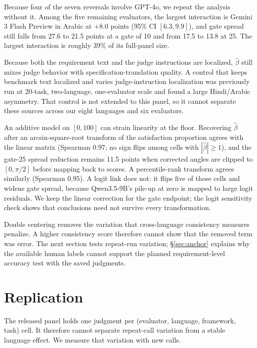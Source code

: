 \documentclass[sigconf,anonymous]{aamas}
\begin{document}
Because four of the seven reversals involve GPT-4o, we repeat the analysis
without it. Among the five remaining evaluators, the largest interaction is
Gemini 3 Flash Preview in Arabic at $+8.0$ points (95\% CI $[6.3, 9.9]$), and gate spread still
falls from 27.6 to 21.5 points at a gate of 10 and from 17.5 to 13.8 at 25. The
largest interaction is roughly 39\% of its full-panel size.

Because both the requirement text and the judge instructions are localized,
$\hat\beta$ still mixes judge behavior with specification-translation quality.
A control that keeps benchmark text localized and varies judge-instruction
localization was previously run at 20-task, two-language, one-evaluator scale
\citep{mahmood2026multilingualpromptlocalizationagentasajudge} and found a
large Hindi/Arabic asymmetry. That control is not extended to this panel,
so it cannot separate these sources across our eight languages and six
evaluators.

An additive model on $[0,100]$ can strain linearity at the floor. Recovering
$\hat\beta$ after an arcsin-square-root transform of the satisfaction
proportion agrees with the linear matrix (Spearman $0.97$; no sign flips among
cells with $|\hat\beta|\ge 1$), and the gate-25 spread reduction remains
11.5 points when corrected angles are clipped to $[0,\pi/2]$ before mapping
back to scores. A percentile-rank transform agrees similarly (Spearman $0.95$).
A logit link does not: it flips five of those cells and widens gate spread,
because Qwen3.5-9B's pile-up at zero is mapped to large logit residuals. We keep the
linear correction for the gate endpoint; the logit sensitivity check shows
that conclusions need not survive every transformation.

Double centering removes the variation that cross-language consistency
measures penalize. A higher consistency score therefore cannot show that the
removed term was error. The next section tests repeat-run variation;
\S\ref{sec:anchor} explains why the available human labels cannot support
the planned requirement-level accuracy test with the saved judgments.

\section{Replication}
\label{sec:repl}

The released panel holds one judgment per (evaluator, language, framework,
task) cell. It therefore cannot separate repeat-call variation from a
stable language effect. We measure that variation with new calls.
\end{document}
